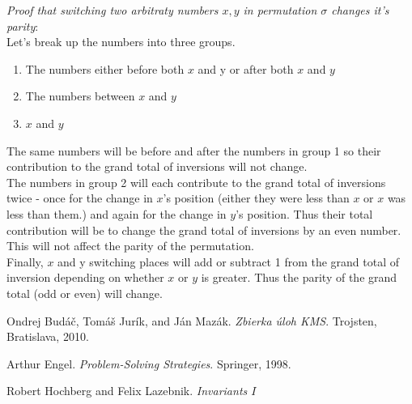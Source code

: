 \documentclass[11pt,a5paper]{article}
\begin{document}
\noindent\emph{Proof that switching two arbitraty numbers $x, y$ in permutation $\sigma$ changes it's parity}:\\
Let's break up the numbers into three groups.
\begin{enumerate}
\item{The numbers either before both $x$ and y or after both $x$ and $y$}
\item{The numbers between $x$ and $y$}
\item{$x$ and $y$}
\end{enumerate}
The same numbers will be before and after the numbers in group 1 so their contribution to the grand total of inversions will not change. \\
The numbers in group 2 will each contribute to the grand total of inversions twice - once for the change in $x$'s position (either they were less than $x$ or $x$ was less than them.) and again for the change in $y$'s position. Thus their total contribution will be to change the grand total of inversions by an even number. This will not affect the parity of the permutation. \\
Finally, $x$ and y switching places will add or subtract 1 from the grand total of inversion depending on whether $x$ or $y$ is greater. Thus the parity of the grand total (odd or even) will change.


\begin{thebibliography}{9}
 Ondrej Budáč, Tomáš Jurík, and Ján Mazák. \emph{Zbierka úloh KMS}. Trojsten, Bratislava, 2010.

Arthur Engel. \emph{Problem-Solving Strategies}. Springer, 1998.

 Robert Hochberg and Felix Lazebnik. \emph{Invariants $I$}

\end{thebibliography}
\end{document}
